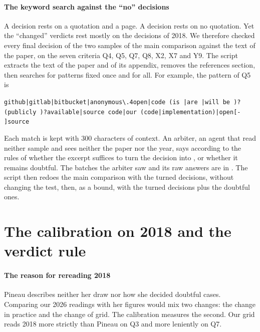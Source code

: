 \paragraph{The keyword search against the \enquote{no} decisions}
A  decision rests on a quotation and a page. A  decision rests on no quotation. Yet the
\enquote{changed} verdicts rest mostly on the  decisions of 2018. We therefore checked
every final  decision of the
two samples of the main comparison against the text of the paper, on the seven criteria Q4, Q5, Q7,
Q8, X2, X7 and Y9. The script  extracts the text of the paper and of its appendix, removes
the references section, then searches for patterns fixed once and for all. For example, the pattern of Q5 is
\begin{center}
\small\verb!github|gitlab|bitbucket|anonymous\.4open|code (is |are |will be )?!\\
\small\verb!(publicly )?available|source code|our (code|implementation)|open[- ]source!
\end{center}
Each match is kept with 300 characters of context. An arbiter, an agent that read neither sample and
sees neither the paper nor the year, says according to the rules of  whether the
excerpt suffices to turn the decision into , or whether it remains doubtful. The batches the
arbiter saw and its raw answers are in . The script
 then redoes the main comparison with the turned decisions, without
changing the test, then, as a bound, with the turned decisions plus the doubtful ones.

\section{The calibration on 2018 and the verdict rule}\label{sec:sm-verdict}

\paragraph{The reason for rereading 2018}
Pineau describes neither her draw nor how she decided doubtful cases. Comparing our 2026 readings with
her figures would mix two changes: the change in practice and the change of grid. The calibration
measures the second. Our grid reads 2018 more strictly than Pineau on Q3 and more leniently on Q7.

